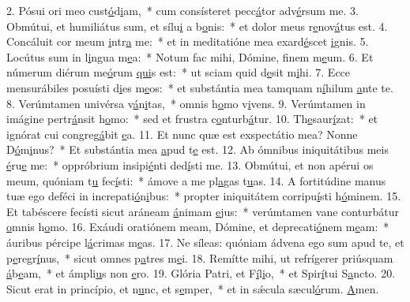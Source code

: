 2. Pósui ori meo cust\uline{ó}d\uline{i}am,~* cum consísteret pecc\uline{á}tor adv\uline{é}rsum me.
3. Obmútui, et humiliátus sum, et sílu\uline{i} a b\uline{o}nis:~* et dolor meus r\uline{e}nov\uline{á}tus est.
4. Concáluit cor meum \uline{i}ntr\uline{a} me:~* et in meditatióne mea exard\uline{é}scet \uline{i}gnis.
5. Locútus sum in l\uline{i}ngua m\uline{e}a:~* Notum fac mihi, Dómine, f\uline{i}nem m\uline{e}um.
6. Et númerum diérum me\uline{ó}rum \uline{qui}s est:~* ut sciam quid d\uline{e}sit m\uline{i}hi.
7. Ecce mensurábiles posuísti d\uline{i}es m\uline{e}os:~* et substántia mea tamquam n\uline{í}hilum \uline{a}nte te.
8. Verúmtamen univérsa v\uline{á}n\uline{i}tas,~* omnis h\uline{o}mo v\uline{i}vens.
9. Verúmtamen in imágine pertr\uline{á}nsit h\uline{o}mo:~* sed et frustra c\uline{o}nturb\uline{á}tur.
10. Th\uline{e}saur\uline{í}zat:~* et ignórat cui congreg\uline{á}bit \uline{e}a.
11. Et nunc quæ est exspectátio mea? Nonne D\uline{ó}m\uline{i}nus?~* Et substántia mea \uline{a}pud t\uline{e} est.
12. Ab ómnibus iniquitátibus meis \uline{é}ru\uline{e} me:~* oppróbrium insipi\uline{é}nti ded\uline{í}sti me.
13. Obmútui, et non apérui os meum, quóniam t\uline{u} fec\uline{í}sti:~* ámove a me pl\uline{a}gas t\uline{u}as.
14. A fortitúdine manus tuæ ego deféci in increpati\uline{ó}n\uline{i}bus:~* propter iniquitátem corripu\uline{í}sti h\uline{ó}minem.
15. Et tabéscere fecísti sicut aráneam \uline{á}nimam \uline{e}jus:~* verúmtamen vane conturbátur \uline{o}mnis h\uline{o}mo.
16. Exáudi oratiónem meam, Dómine, et deprecati\uline{ó}nem m\uline{e}am:~* áuribus pércipe l\uline{á}crimas m\uline{e}as.
17. Ne síleas: quóniam ádvena ego sum apud te, et p\uline{e}regr\uline{í}nus,~* sicut omnes p\uline{a}tres m\uline{e}i.
18. Remítte mihi, ut refrígerer priúsquam \uline{á}b\uline{e}am,~* et ámpli\uline{u}s non \uline{e}ro.
19. Glória Patri, et F\uline{í}l\uline{i}o,~* et Spir\uline{í}tui S\uline{a}ncto.
20. Sicut erat in princípio, et n\uline{u}nc, et s\uline{e}mper,~* et in sǽcula sæcul\uline{ó}rum. \uline{A}men.
